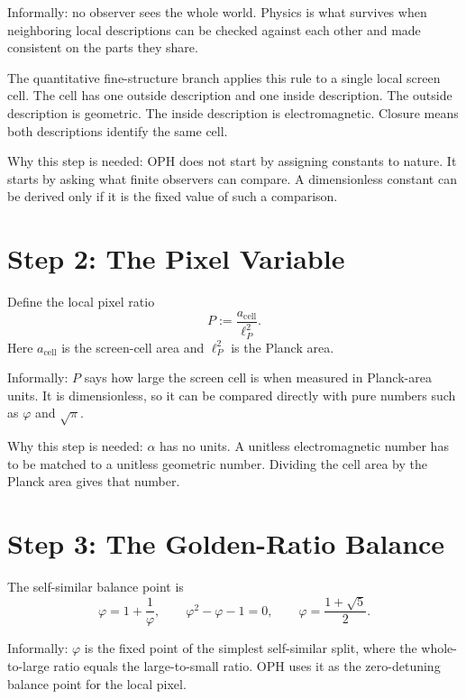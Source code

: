 \documentclass[11pt]{article}
\theoremstyle{remark}
\begin{document}
Informally: no observer sees the whole world. Physics is what survives when neighboring local descriptions can be checked against each other and made consistent on the parts they share.

The quantitative fine-structure branch applies this rule to a single local screen cell. The cell has one outside description and one inside description. The outside description is geometric. The inside description is electromagnetic. Closure means both descriptions identify the same cell.

Why this step is needed: OPH does not start by assigning constants to nature. It starts by asking what finite observers can compare. A dimensionless constant can be derived only if it is the fixed value of such a comparison.

\section{Step 2: The Pixel Variable}

Define the local pixel ratio
\begin{equation}
P:=\frac{a_{\mathrm{cell}}}{\ell_P^2}.
\label{eq:Pdef}
\end{equation}
Here \(a_{\mathrm{cell}}\) is the screen-cell area and \(\ell_P^2\) is the Planck area.

Informally: \(P\) says how large the screen cell is when measured in Planck-area units. It is dimensionless, so it can be compared directly with pure numbers such as \(\varphi\) and \(\sqrt\pi\).

Why this step is needed: \(\alpha\) has no units. A unitless electromagnetic number has to be matched to a unitless geometric number. Dividing the cell area by the Planck area gives that number.

\section{Step 3: The Golden-Ratio Balance}

The self-similar balance point is
\begin{equation}
\varphi=1+\frac{1}{\varphi},
\qquad
\varphi^2-\varphi-1=0,
\qquad
\varphi=\frac{1+\sqrt5}{2}.
\label{eq:phi}
\end{equation}

Informally: \(\varphi\) is the fixed point of the simplest self-similar split, where the whole-to-large ratio equals the large-to-small ratio. OPH uses it as the zero-detuning balance point for the local pixel.
\end{document}

